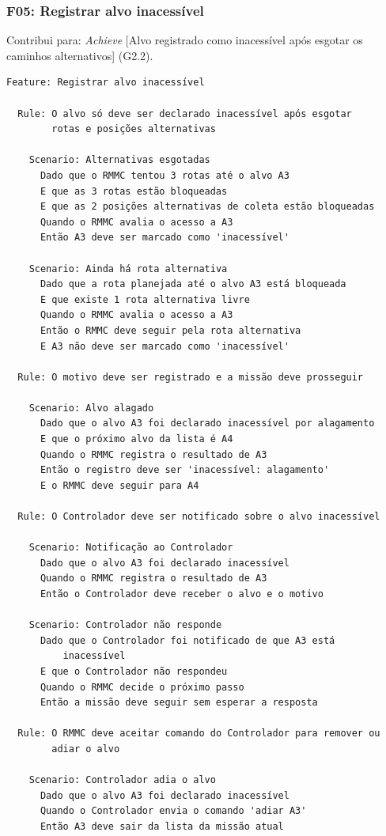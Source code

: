 \documentclass[a4paper, 12pt]{article}
\begin{document}
\Needspace{8cm}
\subsubsection{F05: Registrar alvo inacessível}

Contribui para: \textit{Achieve} [Alvo registrado como inacessível após esgotar os caminhos alternativos] (G2.2).

{\small
\begin{verbatim}
Feature: Registrar alvo inacessível

  Rule: O alvo só deve ser declarado inacessível após esgotar
        rotas e posições alternativas

    Scenario: Alternativas esgotadas
      Dado que o RMMC tentou 3 rotas até o alvo A3
      E que as 3 rotas estão bloqueadas
      E que as 2 posições alternativas de coleta estão bloqueadas
      Quando o RMMC avalia o acesso a A3
      Então A3 deve ser marcado como 'inacessível'

    Scenario: Ainda há rota alternativa
      Dado que a rota planejada até o alvo A3 está bloqueada
      E que existe 1 rota alternativa livre
      Quando o RMMC avalia o acesso a A3
      Então o RMMC deve seguir pela rota alternativa
      E A3 não deve ser marcado como 'inacessível'

  Rule: O motivo deve ser registrado e a missão deve prosseguir

    Scenario: Alvo alagado
      Dado que o alvo A3 foi declarado inacessível por alagamento
      E que o próximo alvo da lista é A4
      Quando o RMMC registra o resultado de A3
      Então o registro deve ser 'inacessível: alagamento'
      E o RMMC deve seguir para A4

  Rule: O Controlador deve ser notificado sobre o alvo inacessível

    Scenario: Notificação ao Controlador
      Dado que o alvo A3 foi declarado inacessível
      Quando o RMMC registra o resultado de A3
      Então o Controlador deve receber o alvo e o motivo

    Scenario: Controlador não responde
      Dado que o Controlador foi notificado de que A3 está
          inacessível
      E que o Controlador não respondeu
      Quando o RMMC decide o próximo passo
      Então a missão deve seguir sem esperar a resposta

  Rule: O RMMC deve aceitar comando do Controlador para remover ou
        adiar o alvo

    Scenario: Controlador adia o alvo
      Dado que o alvo A3 foi declarado inacessível
      Quando o Controlador envia o comando 'adiar A3'
      Então A3 deve sair da lista da missão atual
\end{verbatim}
}
\end{document}
